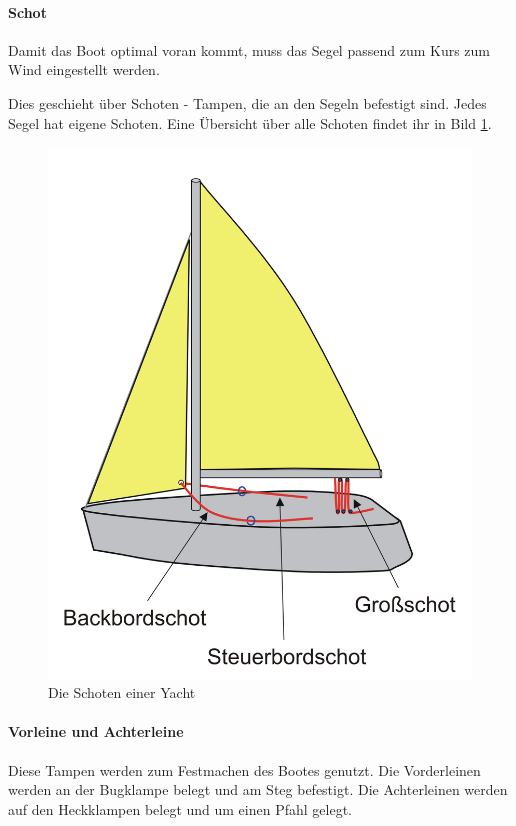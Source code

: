 \documentclass[12pt]{article}
\begin{document}
\paragraph{Schot}
Damit das Boot optimal voran kommt, muss das Segel passend zum Kurs zum Wind eingestellt werden.

Dies geschieht über Schoten - Tampen, die an den Segeln befestigt sind. Jedes Segel hat eigene Schoten. Eine Übersicht über alle Schoten findet ihr in Bild \ref{schoten}.

\begin{figure}[h!]
\begin{center}
\includegraphics[scale=0.4]{bilder/schoten.png}
\end{center}
\caption{Die Schoten einer Yacht}
\label{schoten}
\end{figure}

\paragraph{Vorleine und Achterleine}
Diese Tampen werden zum Festmachen des Bootes genutzt. Die Vorderleinen werden an der Bugklampe belegt und am Steg befestigt. Die Achterleinen werden auf den Heckklampen belegt und um einen Pfahl gelegt.
\end{document}
